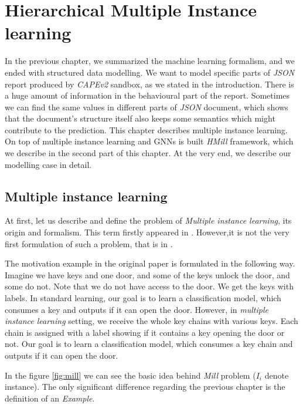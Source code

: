 \chapter{Hierarchical Multiple Instance learning} \label{chap:hmill}
In the previous chapter, we summarized the machine learning formalism, and we ended with structured data modelling. We want to model specific parts of \emph{JSON} report produced by \emph{CAPEv2} sandbox, as we stated in the introduction. There is a huge amount of information in the behavioural part of the report. Sometimes we can find the same values in different parts of \emph{JSON} document, which shows that the document's structure itself also keeps some semantics which might contribute to the prediction. This chapter describes multiple instance learning. On top of multiple instance learning and GNNs is built \emph{HMill} framework, which we describe in the second part of this chapter. At the very end, we describe our modelling case in detail.


\section{Multiple instance learning}
At first, let us describe and define the problem of \emph{Multiple instance learning}, its origin and formalism. This term firstly appeared in \cite{Dietterich1997}. However,it is not the very first formulation of such a problem, that is in \cite{Keeler1991}.

The motivation example in the original paper \cite{Dietterich1997} is formulated in the following way. Imagine we have keys and one door, and some of the keys unlock the door, and some do not. Note that we do not have access to the door. We get the keys with labels. In standard learning, our goal is to learn a classification model, which consumes a key and outputs if it can open the door. However, in \emph{multiple instance learning} setting, we receive the whole key chains with various keys. Each chain is assigned with a label showing if it contains a key opening the door or not. Our goal is to learn a classification model, which consumes a key chain and outputs if it can open the door.

In the figure \ref{fig:mill} we can see the basic idea behind \emph{Mill} problem ($I_i$ denote instance). The only significant difference regarding the previous chapter is the definition of an \emph{Example}. 
